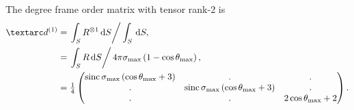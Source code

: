 
The  degree frame order matrix with tensor rank-2 is
\begin{subequations} \label{eq: iso cone 1st degree frame order matrix}
\begin{align}
    \FOone &= \left. \int_S R^{\otimes 1} \diff S \right / \int_S \diff S , \\
           &= \left. \int_S R \diff S \right / 4\pi \conesmax \left( 1 - \cos\conethetamax \right) , \\
           &= \quart \begin{pmatrix}
                  \sinc\conesmax \left( \cos\conethetamax + 3 \right) & .                                                   & . \\
                  .                                                   & \sinc\conesmax \left( \cos\conethetamax + 3 \right) & . \\
                  .                                                   & .                                                   & 2\cos\conethetamax + 2 \\
              \end{pmatrix} .
\end{align}
\end{subequations}



